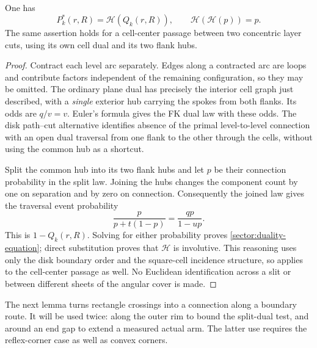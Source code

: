 \begin{lemma}\label{sector:duality}
One has
\begin{equation}\label{sector:duality-equation}
 P_k^*(r,R)=\mathcal H(Q_k(r,R)),\qquad
 \mathcal H(\mathcal H(p))=p.
\end{equation}
The same assertion holds for a cell-center passage between two
concentric layer cuts, using its own cell dual and its two flank hubs.
\end{lemma}

\begin{proof}
Contract each level arc separately.  Edges along a contracted arc are
loops and contribute factors independent of the remaining configuration,
so they may be omitted.  The ordinary plane dual has precisely the
interior cell graph just described, with a \emph{single} exterior hub
carrying the spokes from both flanks.  Its odds are $q/v=v$.
Euler's formula gives the FK dual law with these odds.  The disk
path--cut alternative identifies absence of the primal level-to-level
connection with an open dual traversal from one flank to the other
through the cells, without using the common hub as a shortcut.

Split the common hub into its two flank hubs and let $p$ be their
connection probability in the split law.  Joining the hubs changes the
component count by one on separation and by zero on connection.
Consequently the joined law gives the traversal event probability
\[
 \frac{p}{p+t(1-p)}=\frac{q p}{1-up}.
\]
This is $1-Q_k(r,R)$.  Solving for either probability proves
\eqref{sector:duality-equation}; direct substitution proves that
$\mathcal H$ is involutive.  This reasoning uses only the disk boundary
order and the square-cell incidence structure, so applies to the
cell-center passage as well.  No Euclidean identification across a slit
or between different sheets of the angular cover is made.
\end{proof}

The next lemma turns rectangle crossings into a connection along a
boundary route.  It will be used twice: along the outer rim to bound the
split-dual test, and around an end gap to extend a measured actual arm.
The latter use requires the reflex-corner case as well as convex corners.

